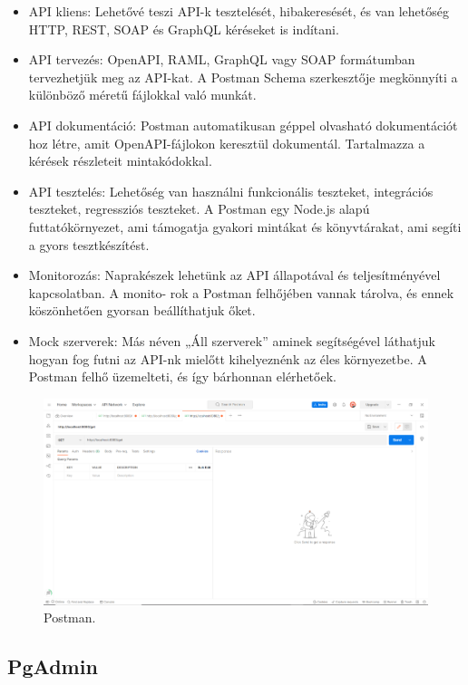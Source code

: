 \begin{itemize}
\item API kliens: Lehetővé teszi API-k tesztelését, hibakeresését, és van lehetőség HTTP, REST, SOAP és GraphQL kéréseket is indítani.
\item API tervezés: OpenAPI, RAML, GraphQL vagy SOAP formátumban tervezhetjük meg az API-kat. A Postman Schema szerkesztője megkönnyíti a különböző méretű fájlokkal való munkát.
\item API dokumentáció: Postman automatikusan géppel olvasható dokumentációt hoz létre, amit OpenAPI-fájlokon keresztül dokumentál. Tartalmazza a kérések részleteit mintakódokkal.
\item API tesztelés: Lehetőség van használni funkcionális teszteket, integrációs teszteket, regressziós teszteket. A Postman egy Node.js alapú futtatókörnyezet, ami támogatja gyakori mintákat és  könyvtárakat, ami segíti a gyors tesztkészítést.
\item Monitorozás: Naprakészek lehetünk az API állapotával és teljesítményével kapcsolatban. A monito-
rok a Postman felhőjében vannak tárolva, és ennek köszönhetően gyorsan beállíthatjuk őket.
\item Mock szerverek: Más néven „Áll szerverek” aminek segítségével láthatjuk hogyan fog futni az API-nk mielőtt kihelyeznénk az éles környezetbe. A Postman felhő üzemelteti, és így bárhonnan elérhetőek.
\end{itemize}

\begin{figure}[h]
\centering
\includegraphics[scale=0.8]{images/Postman.png}
\caption{Postman.}
\label{fig:Postman}
\end{figure}
\newpage

\subsection{PgAdmin}

